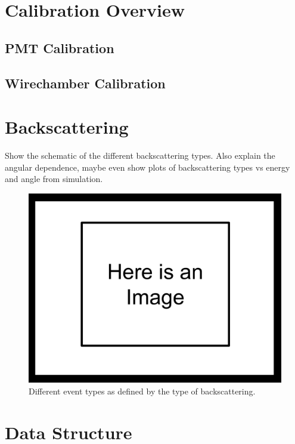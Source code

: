 \section{Calibration Overview}

\subsection{PMT Calibration}

\subsection{Wirechamber Calibration}

 
\section{Backscattering}

Show the schematic of the different backscattering types. Also explain the 
angular dependence, maybe even show plots of backscattering types vs energy 
and angle from simulation.

\begin{figure}[h]
\centering
\includegraphics[scale=.25]{3-UCNAAnalysis/ImageHolder.pdf}
\caption{Different event types as defined by the type of backscattering.}
\end{figure}

\section{Data Structure}

